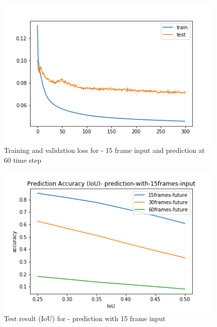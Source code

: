 \begin{figure}[H] 
\includegraphics[scale=0.8]{conf9_300e_60ffuture}
\begin{center}
\caption{Training and validation loss for - 15 frame input and prediction at 60 time step }
\label{15-60}
\end{center}
\end{figure}

\begin{figure}[H] 
\includegraphics[scale=0.8]{prediction-with-15frames-input_IoU}
\begin{center}
\caption{Test result (IoU) for - prediction with 15 frame input}
\label{15-IoU}
\end{center}
\end{figure}

